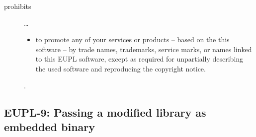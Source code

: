 \begin{description}
\begin{itemize}
\end{itemize}

\item[prohibits] \ldots
\begin{itemize}
  \item to promote any of your services or products – based on the this software
  – by trade names, trademarks, service marks, or names linked to this EUPL
  software, except as required for unpartially describing the used software and
  reproducing the copyright notice.
\end{itemize}.

\end{description}


\subsection{EUPL-9: Passing a modified library as embedded binary}

